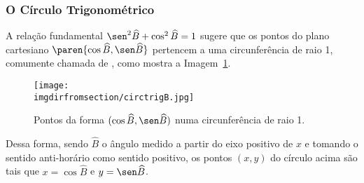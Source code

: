 \subsubsection{O Círculo Trigonométrico}

A relação fundamental $\sen^2 \widehat B + \cos^2 \widehat B = 1$
sugere que os pontos do plano cartesiano $\paren{\cos \widehat B,
\sen \widehat B}$ pertencem a uma circunferência de raio 1, comumente 
chamada de , como
mostra a Imagem~\ref{fig:circulo-trigonometrico-b}.
%
\begin{figure}[H]
\centering
\texttt{[image: \\imgdirfromsection/circtrigB.jpg]}
\caption{Pontos da forma $(\cos \widehat B, \sen \widehat B)$ numa circunferência de raio 1.}
\label{fig:circulo-trigonometrico-b}
\end{figure}

Dessa forma, sendo $\widehat B$ o ângulo medido a partir do eixo
positivo de $x$ e tomando o sentido anti-horário como sentido
positivo, os pontos $(x, y)$ do círculo acima são tais que $x = \cos
\widehat B$ e $y = \sen \widehat B$.
